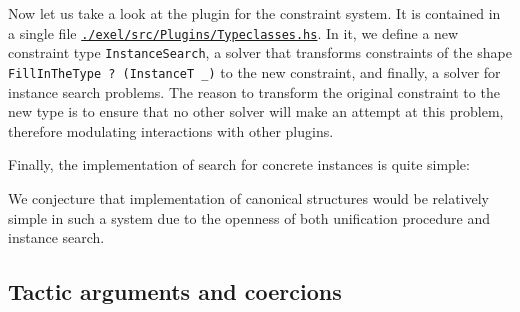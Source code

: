 Now let us take a look at the plugin for the constraint system. It is
contained in a single file
\href{https://github.com/liesnikov/extensible-elaborator/blob/elaborator-experiments/exel/src/Plugins/Typeclasses.hs}{\texttt{./exel/src/Plugins/Typeclasses.hs}}.
In it, we define a new constraint type \texttt{InstanceSearch}, a solver
that transforms constraints of the shape
\texttt{FillInTheType\ ?\ (InstanceT\ \_)} to the new constraint, and
finally, a solver for instance search problems. The reason to transform
the original constraint to the new type is to ensure that no other
solver will make an attempt at this problem, therefore modulating
interactions with other plugins.

Finally, the implementation of search for concrete instances is quite
simple:

\begin{imageonly}
\begin{Shaded}
\begin{Highlighting}[]
\OtherTok{=} 
  \NormalTok{ (}\NormalTok{ (}\OtherTok{=}
\OtherTok{\textless{}{-}}\OperatorTok{\textless{}$\textgreater{}}
\OtherTok{\textless{}{-}}
    \OtherTok{{-}\textgreater{}} 
       
     \OtherTok{{-}\textgreater{}}  
\end{Highlighting}
\end{Shaded}
\end{imageonly}

We conjecture that implementation of canonical structures
\citep{mahboubiCanonicalStructuresWorking2013} would be relatively
simple in such a system due to the openness of both unification
procedure and instance search.

\hypertarget{sec:coercion-tactics}{%
\subsection{Tactic arguments and coercions}\label{sec:coercion-tactics}}

